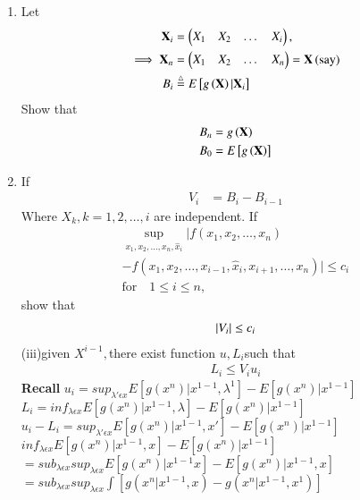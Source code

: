 \documentclass[journal,12pt,twocolumn]{IEEEtran}
\renewcommand\thesection{\arabic{section}}
\begin{document}
\begin{enumerate}[label=\thesection.\arabic*,ref=\thesection.\theenumi]
\item Let 
\begin{align}
\mathbf{X}_i &= \begin{pmatrix}X_1 & X_2 & \dots & X_i\end{pmatrix},
\\
\implies \mathbf{X}_n &= \begin{pmatrix}X_1 & X_2 & \dots & X_n\end{pmatrix}=\mathbf{X}\, \text{(say)}
\\
B_i &\stackrel{\triangle}{=} E{}\left[g\left(\mathbf{X}\right) |\mathbf{X}_i\right]
\end{align}
Show that
\begin{align}
B_n &= g\left(\mathbf{X}\right)
\\
B_0 &= E{}\left[g\left(\mathbf{X}\right)\right]
\end{align}
\item If
\begin{align}
V_i &=B_i - B_{i-1}
\end{align}
Where $X_k, k = 1, 2, \dots, i$  are independent. If 
\begin{multline}
\sup _{{x_{1},x_{2},\dots ,x_{n},{\hat  x}_{i}}}|f(x_{1},x_{2},\dots ,x_{n})
\\
-f(x_{1},x_{2},\dots ,x_{{i-1}},{\hat  x}_{i},x_{{i+1}},\dots ,x_{n})|\leq c_{i}
\\
 {\text{for}}\quad 1\leq i\leq n,
\end{multline}
%
show that
\begin{align}
\left\vert V_i\right\vert \le c_i
\end{align}
\solution
(iii)given $X^{i-1},$there exist function $u,L_i$such that
\begin{align}
[u_i-L_i \leqslant c_i] L_i\leqslant V_i u_i
\end{align}
\textbf{Recall} $u_i=sup_{\lambda '\epsilon x} {E[g(x^n)|x^{1-1},\lambda^1]-E[g(x^n)|x^{1-1}]}$\\
 
$ L_i=inf_{\lambda \epsilon x}  {E[g(x^n)|x^{1-1},\lambda ]-E[g(x^n)|x^{1-1}]}$\\

$u_i-L_i=sup_{\lambda'\epsilon x}{E[g(x^n)|x^{1-1},x']-E[g(x^n)|x^{1-1}]}$\\

$inf_{\lambda \epsilon x} {E[g(x^n)|x^{1-1},x]-E[g(x^n)|x^{1-1}]}$\\

$=sub_{\lambda \epsilon x} sup_{\lambda \epsilon x} {E[g(x^n)|x^{1-1}x]-E[g(x^n)|x^{1-1},x]}$\\

$=sub_{\lambda \epsilon x} sup_{\lambda \epsilon x}\int [g(x^n|x^{1-1},x)-g(x^n|x^{1-1},x^1)]$\\
 

\end{enumerate}
\end{document}
